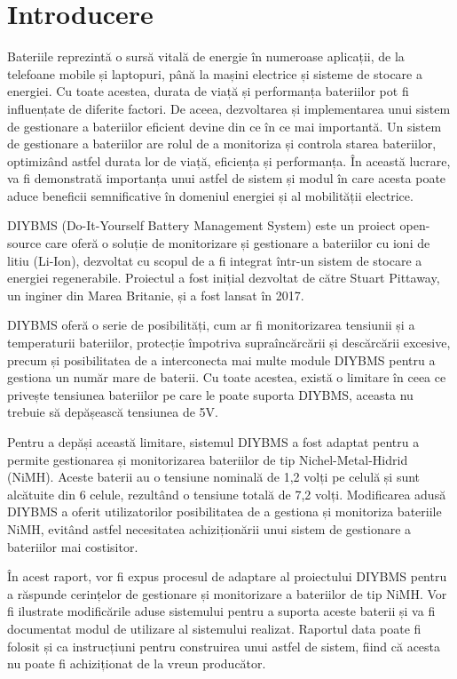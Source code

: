 \clearpage
\section*{Introducere}

Bateriile reprezintă o sursă vitală de energie în numeroase aplicații, de la telefoane mobile și laptopuri, până la mașini electrice și sisteme de stocare a energiei. Cu toate acestea, durata de viață și performanța bateriilor pot fi influențate de diferite factori. De aceea, dezvoltarea și implementarea unui sistem de gestionare a bateriilor eficient devine din ce în ce mai importantă. Un sistem de gestionare a bateriilor are rolul de a monitoriza și controla starea bateriilor, optimizând astfel durata lor de viață, eficiența și performanța. În această lucrare, va fi demonstrată importanța unui astfel de sistem și modul în care acesta poate aduce beneficii semnificative în domeniul energiei și al mobilității electrice.

DIYBMS (Do-It-Yourself Battery Management System) \cite{bms-intro} este un proiect open-source care oferă o soluție de monitorizare și gestionare a bateriilor cu ioni de litiu (Li-Ion), dezvoltat cu scopul de a fi integrat într-un sistem de stocare a energiei regenerabile. Proiectul a fost inițial dezvoltat de către Stuart Pittaway, un inginer din Marea Britanie, și a fost lansat în 2017. 

DIYBMS oferă o serie de posibilități, cum ar fi monitorizarea tensiunii și a temperaturii bateriilor, protecție împotriva supraîncărcării și descărcării excesive, precum și posibilitatea de a interconecta mai multe module DIYBMS pentru a gestiona un număr mare de baterii. Cu toate acestea, există o limitare în ceea ce privește tensiunea bateriilor pe care le poate suporta DIYBMS, aceasta nu trebuie să depășească tensiunea de 5V.

Pentru a depăși această limitare, sistemul DIYBMS a fost adaptat pentru a permite gestionarea și monitorizarea bateriilor de tip Nichel-Metal-Hidrid (NiMH). Aceste baterii au o tensiune nominală de 1,2 volți pe celulă și sunt alcătuite din 6 celule, rezultând o tensiune totală de 7,2 volți. Modificarea adusă DIYBMS a oferit utilizatorilor posibilitatea de a gestiona și monitoriza bateriile NiMH, evitând astfel necesitatea achiziționării unui sistem de gestionare a bateriilor mai costisitor.

În acest raport, vor fi expus procesul de adaptare al proiectului DIYBMS pentru a răspunde cerințelor de gestionare și monitorizare a bateriilor de tip NiMH. Vor fi ilustrate modificările aduse sistemului pentru a suporta aceste baterii și va fi documentat modul de utilizare al sistemului realizat. Raportul data poate fi folosit și ca instrucțiuni pentru construirea unui astfel de sistem, fiind că acesta nu poate fi achiziționat de la vreun producător.

